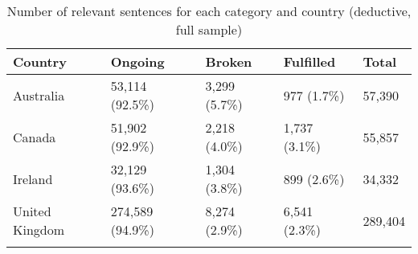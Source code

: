 \begingroup\footnotesize
\begin{longtable}{p{}p{}p{}p{}p{}}
\caption{Number of relevant sentences for each category and country (deductive, full sample)} \\ 
  \hline
Country & Ongoing & Broken & Fulfilled & Total \\ 
  \hline 
\endhead 
\hline 
\endfoot 
\endlastfoot 
Australia & 53,114 (92.5\%) & 3,299 (5.7\%) & 977 (1.7\%) & 57,390 \\ 
  Canada & 51,902 (92.9\%) & 2,218 (4.0\%) & 1,737 (3.1\%) & 55,857 \\ 
  Ireland & 32,129 (93.6\%) & 1,304 (3.8\%) & 899 (2.6\%) & 34,332 \\ 
  United Kingdom & 274,589 (94.9\%) & 8,274 (2.9\%) & 6,541 (2.3\%) & 289,404 \\ 
  \hline
\label{tab:articles_deductive_full}
\end{longtable}
\endgroup
